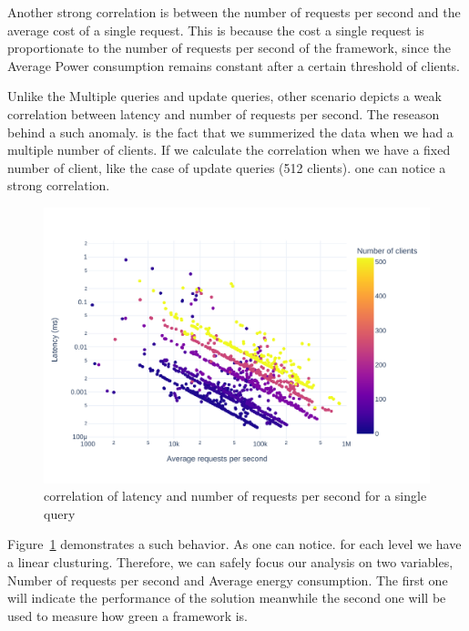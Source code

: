 Another strong correlation is between the number of requests per second and the average cost of a single request. This is because the cost a single request is proportionate to the number of requests per second of the framework, since the Average Power consumption remains constant after a certain threshold of clients.

Unlike the Multiple queries and update queries, other scenario depicts a weak correlation between latency and number of requests per second. The reseason behind a such anomaly. is the fact that we summerized the data when we had a multiple number of clients. If we calculate the correlation when we have a fixed number of client, like the case of update queries (512 clients). one can notice a strong correlation.
\begin{figure}[bht]
    \centering
    \includegraphics[width=.8\columnwidth ]{imgs/scatter_db_latency_rps}
    \caption{correlation of latency and number of requests per second for a single query}
    \label{fig:scatter_db}
\end{figure}
Figure~\ref{fig:scatter_db} demonstrates a such behavior. As one can notice. for each level we have a linear clusturing.
Therefore, we can safely focus our analysis on two variables, Number of requests per second and Average energy consumption. The first one will indicate the performance of the solution meanwhile the second one will be used to measure how green a framework is.

